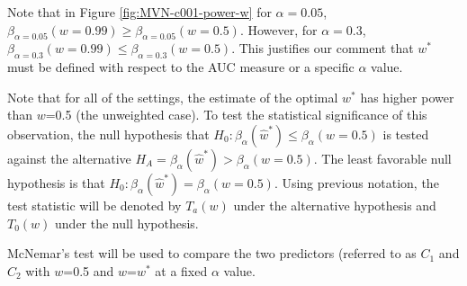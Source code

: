 \documentclass[12pt,oneside,final]{thesis}\usepackage[]{graphicx}\usepackage[]{color}
\begin{document}
Note that in Figure \ref{fig:MVN-c001-power-w} for $\alpha=0.05$, $\beta_{\alpha=0.05}(w=0.99)\geq\beta_{\alpha=0.05}(w=0.5)$. However, for $\alpha=0.3$, $\beta_{\alpha=0.3}(w=0.99)\leq\beta_{\alpha=0.3}(w=0.5)$. This justifies our comment that  $w^{*}$  must be defined with respect to  the AUC measure or a specific $\alpha$ value.

Note that  for all of the settings, the estimate of the optimal $w^{*}$ has  higher power than $w$=0.5 (the unweighted case).
To test the statistical significance of this observation,   the null hypothesis that  $H_{0}: \beta_{\alpha}({\hat{w}^*})\leq\beta_{\alpha}({w=0.5})$  is tested against the alternative $H_{A}=\beta_{\alpha}({\hat{w}^*})>\beta_{\alpha}({w=0.5})$.  The least favorable null hypothesis is that  $H_{0}: \beta_{\alpha}({\hat{w}^*})=\beta_{\alpha}({w=0.5})$.
Using previous notation,  the test statistic will be denoted by $T_a(w)$ under the alternative hypothesis and $T_0(w)$ under the null hypothesis.

McNemar's test will be used to compare the two predictors (referred to as $C_1$ and $C_2$ with $w$=0.5 and $w$=$w^*$ at a fixed $\alpha$ value.
\end{document}
